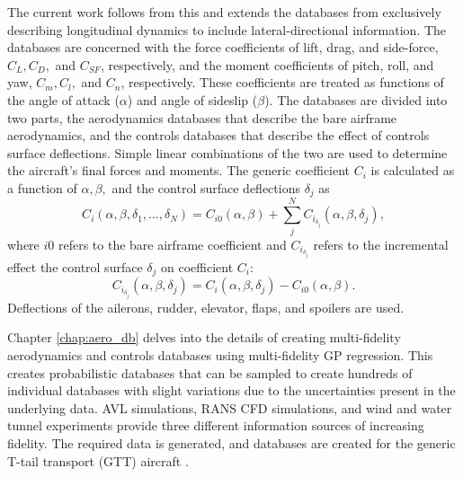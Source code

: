 The current work follows from this and extends the databases from exclusively describing longitudinal dynamics to include lateral-directional information. 
The databases are concerned with the force coefficients of lift, drag, and side-force, $C_L, C_D,$ and $C_{SF}$, respectively, and the moment coefficients of pitch, roll, and yaw, $C_m, C_l,$ and $C_n$, respectively. 
These coefficients are treated as functions of the angle of attack ($\alpha$) and angle of sideslip ($\beta$).
The databases are divided into two parts, the aerodynamics databases that describe the bare airframe aerodynamics, and the controls databases that describe the effect of controls surface deflections. 
Simple linear combinations of the two are used to determine the aircraft's final forces and moments.
The generic coefficient $C_i$ is calculated as a function of $\alpha, \beta,$ and the control surface deflections $\delta_j$ as
\begin{equation}
    C_i\left (\alpha, \beta, \delta_1, ..., \delta_N \right ) = C_{i0} \left (\alpha, \beta \right ) + \sum_{j}^{N} C_{i_{\delta_j}}  \left (\alpha, \beta, \delta_j \right ),
\end{equation}
where $i0$ refers to the bare airframe coefficient and $C_{i_{\delta_j}}$ refers to the incremental effect the control surface $\delta_j$ on coefficient $C_i$:
\begin{equation}
    C_{i_{\delta_j}}  \left (\alpha, \beta, \delta_j \right ) = C_i \left (\alpha, \beta, \delta_j \right ) - C_{i0} \left (\alpha, \beta \right ).
\end{equation}
Deflections of the ailerons, rudder, elevator, flaps, and spoilers are used.

Chapter \ref{chap:aero_db} delves into the details of creating multi-fidelity aerodynamics and controls databases using multi-fidelity GP regression.
This creates probabilistic databases that can be sampled to create hundreds of individual databases with slight variations due to the uncertainties present in the underlying data. 
AVL simulations, RANS CFD simulations, and wind and water tunnel experiments provide three different information sources of increasing fidelity.
The required data is generated, and databases are created for the generic T-tail transport (GTT) aircraft \cite{cunningham_generic_2018}.